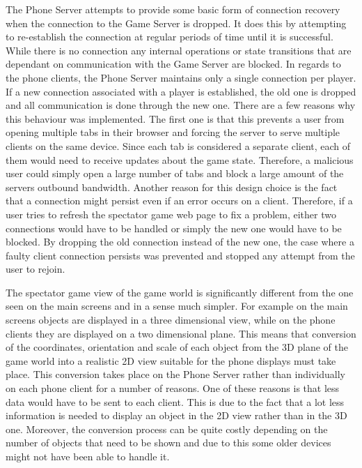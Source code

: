 \documentclass[a4paper,11pt]{article}
\begin{document}
The Phone Server attempts to provide some basic form of connection recovery when the connection to the Game Server is dropped. It does this by attempting to re-establish the connection at regular periods of time until it is successful. While there is no connection any internal operations or state transitions that are dependant on communication with the Game Server are blocked. In regards to the phone clients, the Phone Server maintains only a single connection per player. If a new connection associated with a player is established, the old one is dropped and all communication is done through the new one. There are a few reasons why this behaviour was implemented. The first one is that this prevents a user from opening multiple tabs in their browser and forcing the server to serve multiple clients on the same device. Since each tab is considered a separate client, each of them would need to receive updates about the game state. Therefore, a malicious user could simply open a large number of tabs and block a large amount of the servers outbound bandwidth. Another reason for this design choice is the fact that a connection might persist even if an error occurs on a client. Therefore, if a user tries to refresh the spectator game web page to fix a problem, either two connections would have to be handled or simply the new one would have to be blocked. By dropping the old connection instead of the new one, the case where a faulty client connection persists was prevented and stopped any attempt from the user to rejoin.

The spectator game view of the game world is significantly different from the one seen on the main screens and in a sense much simpler. For example on the main screens objects are displayed in a three dimensional view, while on the phone clients they are displayed on a two dimensional plane. This means that conversion of the coordinates, orientation and scale of each object from the 3D plane of the game world into a realistic 2D view suitable for the phone displays must take place. This conversion takes place on the Phone Server rather than individually on each phone client for a number of reasons. One of these reasons is that less data would have to be sent to each client. This is due to the fact that a lot less information is needed to display an object in the 2D view rather than in the 3D one. Moreover, the conversion process can be quite costly depending on the number of objects that need to be shown and due to this some older devices might not have been able to handle it.
\end{document}
